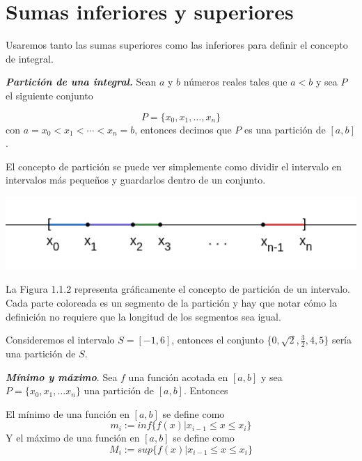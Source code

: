 \documentclass{report}
\begin{document}
    \section{Sumas inferiores y superiores}
    Usaremos tanto las sumas superiores como las inferiores para definir el concepto de integral.

    \begin{defBox}
        \textit{\textbf{Partición de una integral.}} Sean $a$ y $b$ números reales tales que $a<b$ y sea $P$ el siguiente conjunto

        $$P = \{x_0, x_1, \dots , x_n\}$$ con $a=x_0<x_1<\cdots<x_n=b$, entonces decimos que $P$ es una partición de $[a,b]$.
    \end{defBox}

    El concepto de partición se puede ver simplemente como dividir el intervalo en intervalos más pequeños y guardarlos dentro de un conjunto.
    \begin{Figure}
        \begin{center}
            \includegraphics[width=1\textwidth]{images/partitions2.png}
        \end{center}
    \end{Figure}
    La Figura 1.1.2 representa gráficamente el concepto de partición de un intervalo. Cada parte coloreada es un segmento de la partición y hay que notar cómo la definición no requiere que la longitud de los segmentos sea igual.

    \begin{Example}
        Consideremos el intervalo $S = [-1, 6]$, entonces el conjunto $\{0, \sqrt{2}, \frac{3}{2}, 4, 5\}$ sería una partición de $S$.
    \end{Example}
    \begin{defBox}
        \textit{\textbf{Mínimo y máximo}}. Sea $f$ una función acotada en $[a,b]$ y sea $P = \{x_0, x_1, \dots x_n\}$ una partición de $[a,b]$. Entonces

        El mínimo de una función en $[a,b]$ se define como
        $$m_i := inf\{f(x) | x_{i-1} \leq x \leq x_i\}$$
        Y el máximo de una función en $[a,b]$ se define como
        $$M_i := sup\{f(x) | x_{i-1} \leq x \leq x_i\}$$
    \end{defBox}
\end{document}
